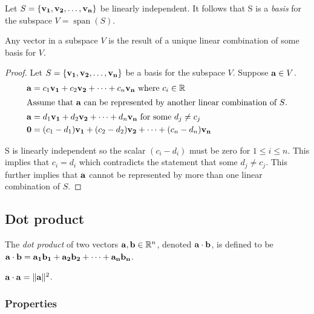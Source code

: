 \documentclass[../main.tex]{subfiles}
\begin{document}
\begin{definition}[Basis]
	Let $S = \{ \mathbf{v_1}, \mathbf{v_2}, \ldots , \mathbf{v_n} \}$ be linearly independent.
	It follows that S is a \textit{basis} for the subspace $V = \operatorname{span}(S)$.
\end{definition}

\begin{lemma}
	Any vector in a subspace $V$ is the result of a unique linear combination
	of some basis for $V$.
\end{lemma}

\begin{proof}
	Let $S = \{ \mathbf{v_1}, \mathbf{v_2}, \ldots , \mathbf{v_n} \}$
	be a basis for the subspace $V$. Suppose $\mathbf{a} \in V$.
	\begin{align*}
		\mathbf{a} & = c_1\mathbf{v_1}+c_2\mathbf{v_2} + \dots + c_n\mathbf{v_n}\ \textnormal{where}\ c_i \in \mathbb{R} \\
		\intertext{Assume that $\mathbf{a}$ can be represented by another linear combination
			of $S$.}
		\mathbf{a} & = d_1\mathbf{v_1} + d_2\mathbf{v_2} + \dots + d_n\mathbf{v_n}\ \textnormal{for some}\ d_j \neq c_j  \\
		\mathbf{0} & = (c_1-d_1)\mathbf{v_1} + (c_2-d_2)\mathbf{v_2} + \dots + (c_n-d_n)\mathbf{v_n}
	\end{align*}

	S is linearly independent so the scalar $(c_i-d_i)$ must be zero for $1 \leq i \leq n$.
	This implies that $c_i=d_i$ which contradicts the statement that some $d_j \neq c_j$.
	This further implies that $\mathbf{a}$ cannot be represented by more than
	one linear combination of $S$.
\end{proof}

\subsection{Dot product}

\begin{definition}
	The \textit{dot product} of two vectors $\mathbf{a}, \mathbf{b} \in \mathbb{R}^n$, denoted
	$\mathbf{a} \cdot \mathbf{b}$, is defined to be
	${\mathbf{a} \cdot \mathbf{b} = \mathbf{a_1}\mathbf{b_1} + \mathbf{a_2}\mathbf{b_2} + \dots + \mathbf{a_n}\mathbf{b_n}}$.
\end{definition}

\begin{lemma}
	$\mathbf{a} \cdot \mathbf{a} = \|\mathbf{a}\| ^2$.
\end{lemma}

\subsubsection{Properties}
\end{document}
